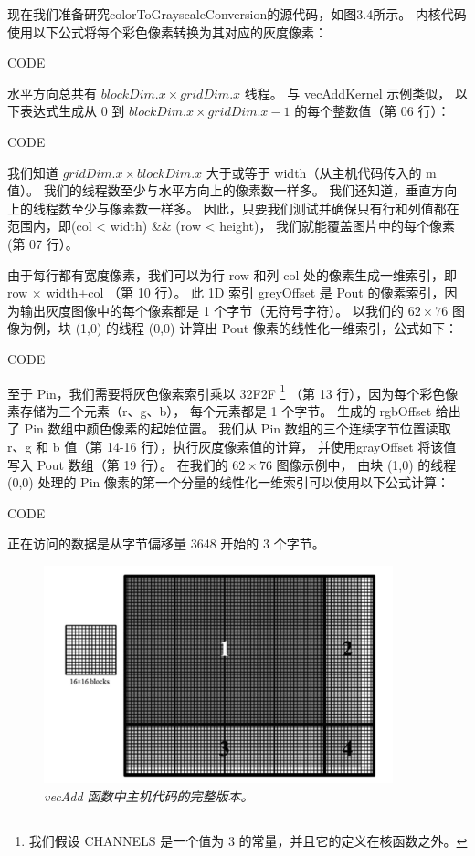 现在我们准备研究colorToGrayscaleConversion的源代码，如图3.4所示。 
内核代码使用以下公式将每个彩色像素转换为其对应的灰度像素：

{\color{red} CODE}

水平方向总共有 $blockDim.x \times gridDim.x$ 线程。 与 vecAddKernel 示例类似，
以下表达式生成从 0 到 $blockDim.x \times gridDim.x - 1$ 的每个整数值（第 06 行）：

{\color{red} CODE}

我们知道 $gridDim.x \times blockDim.x$ 大于或等于 width（从主机代码传入的 m 值）。 
我们的线程数至少与水平方向上的像素数一样多。 我们还知道，垂直方向上的线程数至少与像素数一样多。 
因此，只要我们测试并确保只有行和列值都在范围内，即(col < width) \&\& (row < height)，
我们就能覆盖图片中的每个像素(第 07 行）。

由于每行都有宽度像素，我们可以为行 row 和列 col 处的像素生成一维索引，即 row × width+col （第 10 行）。 
此 1D 索引 greyOffset 是 Pout 的像素索引，因为输出灰度图像中的每个像素都是 1 个字节（无符号字符）。 
以我们的 $62 \times 76$ 图像为例，块 (1,0) 的线程 (0,0) 计算出 Pout 像素的线性化一维索引，公式如下：

{\color{red} CODE}

至于 Pin，我们需要将灰色像素索引乘以 32F2F
\footnote{我们假设 CHANNELS 是一个值为 3 的常量，并且它的定义在核函数之外。}
（第 13 行），因为每个彩色像素存储为三个元素（r、g、b），
每个元素都是 1 个字节。 生成的 rgbOffset 给出了 Pin 数组中颜色像素的起始位置。 
我们从 Pin 数组的三个连续字节位置读取 r、g 和 b 值（第 14-16 行），执行灰度像素值的计算，
并使用grayOffset 将该值写入 Pout 数组（第 19 行）。 在我们的 $62 \times 76$ 图像示例中，
由块 (1,0) 的线程 (0,0) 处理的 Pin 像素的第一个分量的线性化一维索引可以使用以下公式计算：

{\color{red} CODE}

正在访问的数据是从字节偏移量 3648 开始的 3 个字节。

\begin{figure}[H]
	\centering
	\includegraphics[width=0.9\textwidth]{figs/F3.5.png}
	\caption{\textit{\color{red} vecAdd 函数中主机代码的完整版本。}}
\end{figure}

